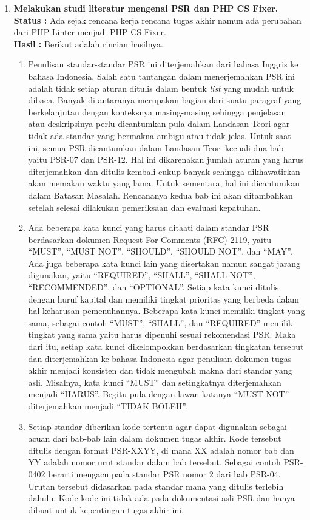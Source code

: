 \documentclass[a4paper,twoside]{article}
\begin{document}
\begin{enumerate}
		\item \textbf{Melakukan studi literatur mengenai PSR dan PHP CS Fixer.}\\
		{\bf Status :} Ada sejak rencana kerja rencana tugas akhir namun ada perubahan dari PHP Linter menjadi PHP CS Fixer.\\
		{\bf Hasil :} Berikut adalah rincian hasilnya.
		\begin{enumerate}
			\item Penulisan standar-standar PSR ini diterjemahkan dari bahasa Inggris ke bahasa Indonesia. Salah satu tantangan dalam menerjemahkan PSR ini adalah tidak setiap aturan ditulis dalam bentuk \textit{list} yang mudah untuk dibaca. Banyak di antaranya merupakan bagian dari suatu paragraf yang berkelanjutan dengan konteksnya masing-masing sehingga penjelasan atau deskripsinya perlu dicantumkan pula dalam Landasan Teori agar tidak ada standar yang bermakna ambigu atau tidak jelas. Untuk saat ini, semua PSR dicantumkan dalam Landasan Teori kecuali dua bab yaitu PSR-07 dan PSR-12. Hal ini dikarenakan jumlah aturan yang harus diterjemahkan dan ditulis kembali cukup banyak sehingga dikhawatirkan akan memakan waktu yang lama. Untuk sementara, hal ini dicantumkan dalam Batasan Masalah. Rencananya kedua bab ini akan ditambahkan setelah selesai dilakukan pemeriksaan dan evaluasi kepatuhan.
			\item Ada beberapa kata kunci yang harus ditaati dalam standar PSR berdasarkan dokumen Request For Comments (RFC) 2119, yaitu ``MUST'', ``MUST NOT'', ``SHOULD'', ``SHOULD NOT'', dan ``MAY''. Ada juga beberapa kata kunci lain yang disertakan namun sangat jarang digunakan, yaitu ``REQUIRED'', ``SHALL'', ``SHALL NOT'', ``RECOMMENDED'', dan ``OPTIONAL''. Setiap kata kunci ditulis dengan huruf kapital dan memiliki tingkat prioritas yang berbeda dalam hal keharusan pemenuhannya. Beberapa kata kunci memiliki tingkat yang sama, sebagai contoh ``MUST'', ``SHALL'', dan ``REQUIRED'' memiliki tingkat yang sama yaitu harus dipenuhi sesuai rekomendasi PSR. Maka dari itu, setiap kata kunci dikelompokkan berdasarkan tingkatan tersebut dan diterjemahkan ke bahasa Indonesia agar penulisan dokumen tugas akhir menjadi konsisten dan tidak mengubah makna dari standar yang asli. Misalnya, kata kunci ``MUST'' dan setingkatnya diterjemahkan menjadi ``HARUS''. Begitu pula dengan lawan katanya ``MUST NOT'' diterjemahkan menjadi ``TIDAK BOLEH''.
			\item Setiap standar diberikan kode tertentu agar dapat digunakan sebagai acuan dari bab-bab lain dalam dokumen tugas akhir. Kode tersebut ditulis dengan format PSR-XXYY, di mana XX adalah nomor bab dan YY adalah nomor urut standar dalam bab tersebut. Sebagai contoh PSR-0402 berarti mengacu pada standar PSR nomor 2 dari bab PSR-04. Urutan tersebut didasarkan pada standar mana yang ditulis terlebih dahulu. Kode-kode ini tidak ada pada dokumentasi asli PSR dan hanya dibuat untuk kepentingan tugas akhir ini.

\end{enumerate}
\end{enumerate}
\end{document}
